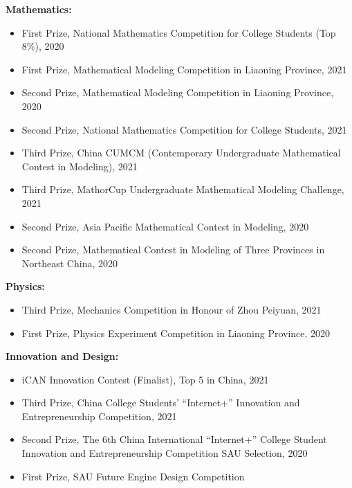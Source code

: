 \documentclass[10pt]{article} %
\begin{document}
\vspace{3mm}

\noindent\textbf{Mathematics:}
\begin{itemize}[leftmargin=*,itemsep=1pt]
    \item First Prize, National Mathematics Competition for College Students (Top 8\%), 2020
    \item First Prize, Mathematical Modeling Competition in Liaoning Province, 2021
    \item Second Prize, Mathematical Modeling Competition in Liaoning Province, 2020
    \item Second Prize, National Mathematics Competition for College Students, 2021
    \item Third Prize, China CUMCM (Contemporary Undergraduate Mathematical Contest in Modeling), 2021
    \item Third Prize, MathorCup Undergraduate Mathematical Modeling Challenge, 2021
    \item Second Prize, Asia Pacific Mathematical Contest in Modeling, 2020
    \item Second Prize, Mathematical Contest in Modeling of Three Provinces in Northeast China, 2020
\end{itemize}

\vspace{3mm}

\noindent\textbf{Physics:}
\begin{itemize}[leftmargin=*,itemsep=1pt]
    \item Third Prize, Mechanics Competition in Honour of Zhou Peiyuan, 2021
    \item First Prize, Physics Experiment Competition in Liaoning Province, 2020
\end{itemize}

\vspace{3mm}

\noindent\textbf{Innovation and Design:}
\begin{itemize}[leftmargin=*,itemsep=1pt]
    \item iCAN Innovation Contest (Finalist), Top 5 in China, 2021
    \item Third Prize, China College Students' “Internet+” Innovation and Entrepreneurship Competition, 2021
    \item Second Prize, The 6th China International “Internet+” College Student Innovation and Entrepreneurship Competition SAU Selection, 2020
    \item First Prize, SAU Future Engine Design Competition
\end{itemize}
\end{document}

